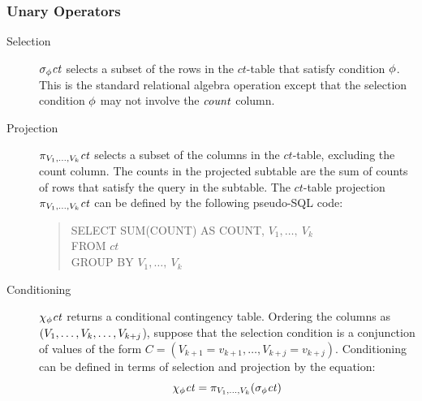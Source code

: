 \documentclass{vldb}
\newcommand{\ct}{\mathit{ct}}
\begin{document}
\subsubsection{Unary Operators} \label{sec:unary}
\begin{description}
\item[Selection] $\sigma_{\selectcond}  \ct$ selects a subset of the rows in the  $\ct$-table  that satisfy condition $\phi$. This is the standard relational algebra operation except that the selection condition $\phi$ may not involve the $\it{count}$ column.
\item[Projection]  %
$\project_{\V_{1},\ldots,\V_{k}} \ct$ selects a subset of the  columns in the  $\ct$-table, excluding the count column. 
The counts in the projected subtable are the sum of counts of rows that satisfy the query in the subtable. 
The  $\ct$-table projection  $\project_{\V_{1},\ldots,\V_{k}} \ct$ can be defined by the following pseudo-SQL code:

\begin{quote}
SELECT SUM(COUNT) AS COUNT, $V_{1}, \ldots,\ V_{k}$ \\
FROM $\ct$ \\
GROUP BY $V_{1}, \ldots,\ V_{k}$
\end{quote}


\item[Conditioning]  $\condition_{\selectcond}  \ct$ returns a conditional contingency table. Ordering the columns as $(V_{1},\ldots,V_{k}, \ldots,V_{k+j}$),  suppose that the selection condition is a conjunction of values of the form $C = (V_{k+1} = v_{k+1},\ldots, V_{k+j} = v_{k+j})$.  Conditioning can be defined in terms of selection and projection by the equation:
\begin{equation}
\condition_{\selectcond}  \ct = \project_{\V_{1},\ldots,\V_{k}} (\select_{\selectcond}  \ct) \nonumber
\end{equation}
\end{description}
\end{document}
